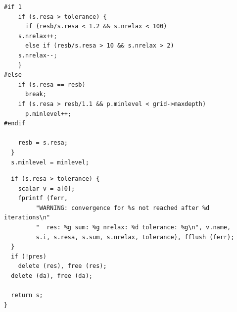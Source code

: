 \documentclass[a4paper]{article}
\newcommand{\func}[1]{\textbf{\textcolor{function}{#1}}}
\newcommand{\para}[1]{\textbf{\emph{\textcolor{para}{#1}}}}
\begin{document}
\begin{multicols}{2}
  \columnbreak
  \begin{verbatim}
#if 1
    if (s.resa > tolerance) {
      if (resb/s.resa < 1.2 && s.nrelax < 100)
	s.nrelax++;
      else if (resb/s.resa > 10 && s.nrelax > 2)
	s.nrelax--;
    }
#else
    if (s.resa == resb)
      break;
    if (s.resa > resb/1.1 && p.minlevel < grid->maxdepth)
      p.minlevel++;
#endif

    resb = s.resa;
  }
  s.minlevel = minlevel;
  \end{verbatim}
\end{multicols}

\begin{center}
\end{center}

\begin{multicols}{2}
  \columnbreak
  \begin{verbatim}
  if (s.resa > tolerance) {
    scalar v = a[0];
    fprintf (ferr, 
	     "WARNING: convergence for %s not reached after %d iterations\n"
	     "  res: %g sum: %g nrelax: %d tolerance: %g\n", v.name,
	     s.i, s.resa, s.sum, s.nrelax, tolerance), fflush (ferr);
  }
  if (!pres)
    delete (res), free (res);
  delete (da), free (da);

  return s;
}
  \end{verbatim}
\end{multicols}
\end{document}
